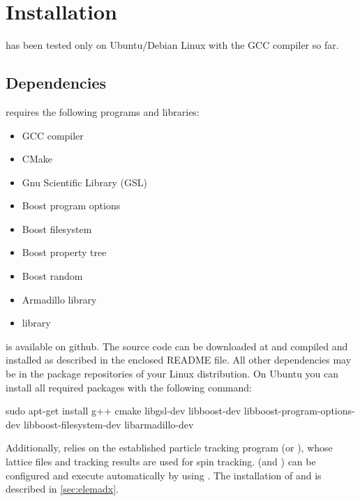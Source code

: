 \documentclass[a4paper]{scrartcl}
\begin{document}
\section{Installation}
\label{sec:installation}

\polem has been tested only on Ubuntu/Debian Linux with the GCC compiler so far.

\subsection{Dependencies}
\label{sec:dependencies}

\polem requires the following programs and libraries:
\begin{multicols}{2}
\begin{itemize}
\item GCC compiler
\item CMake
\item Gnu Scientific Library (GSL) \cite{gsl}
\item Boost program options
\item Boost filesystem
\item Boost property tree %
\item Boost random %
\item Armadillo library \cite{arma}
\item \pal library \cite{palattice}
\end{itemize}
\end{multicols}
\pal is available on github. The source code can be downloaded at \cite{palattice} and
compiled and installed as described in the enclosed README file.
%
All other dependencies may be in the package repositories of your Linux distribution. On
Ubuntu you can install all required packages with the following command:
\begin{bashcode}
  sudo apt-get install g++ cmake libgsl-dev libboost-dev libboost-program-options-dev libboost-filesystem-dev libarmadillo-dev
\end{bashcode}
Additionally, \polem relies on the established particle
tracking program \ele (or \madx), whose lattice files and tracking results are used for
spin tracking.  \ele (and \madx) can be configured and execute automatically by \polem using
\pal. The installation of \ele and \madx is described in \cref{sec:elemadx}.


    
\end{document}
